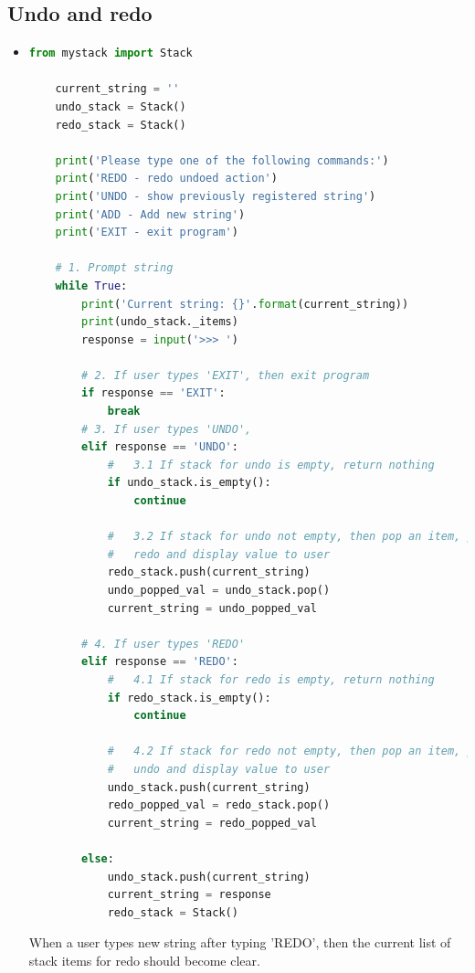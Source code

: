 \documentclass[12pt]{article}
\begin{document}
\subsection*{Undo and redo}
\begin{itemize}
    \item

    \begin{lstlisting}[language=Python,caption={task\_4\_q1\_part\_3\_solution.py},captionpos=b]
    from mystack import Stack

    current_string = ''
    undo_stack = Stack()
    redo_stack = Stack()

    print('Please type one of the following commands:')
    print('REDO - redo undoed action')
    print('UNDO - show previously registered string')
    print('ADD - Add new string')
    print('EXIT - exit program')

    # 1. Prompt string
    while True:
        print('Current string: {}'.format(current_string))
        print(undo_stack._items)
        response = input('>>> ')

        # 2. If user types 'EXIT', then exit program
        if response == 'EXIT':
            break
        # 3. If user types 'UNDO',
        elif response == 'UNDO':
            #   3.1 If stack for undo is empty, return nothing
            if undo_stack.is_empty():
                continue

            #   3.2 If stack for undo not empty, then pop an item, push a copy to
            #   redo and display value to user
            redo_stack.push(current_string)
            undo_popped_val = undo_stack.pop()
            current_string = undo_popped_val

        # 4. If user types 'REDO'
        elif response == 'REDO':
            #   4.1 If stack for redo is empty, return nothing
            if redo_stack.is_empty():
                continue

            #   4.2 If stack for redo not empty, then pop an item, push a copy to
            #   undo and display value to user
            undo_stack.push(current_string)
            redo_popped_val = redo_stack.pop()
            current_string = redo_popped_val

        else:
            undo_stack.push(current_string)
            current_string = response
            redo_stack = Stack()
    \end{lstlisting}

    \bigskip

    When a user types new string after typing 'REDO', then the current list of stack items
    for redo should become clear.
\end{itemize}
\end{document}
